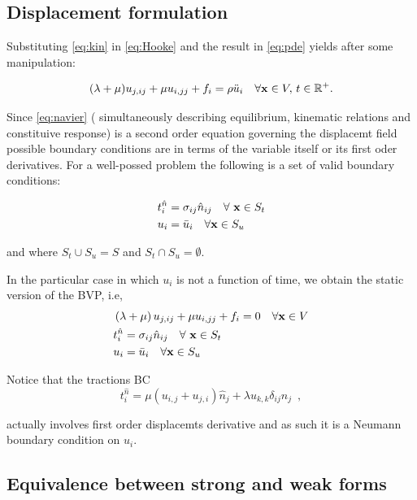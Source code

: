 \subsection*{Displacement formulation}
Substituting \cref{eq:kin} in \cref{eq:Hooke} and the result in \cref{eq:pde} yields after some manipulation:

\begin{equation} \label{eq:navier}
(\lambda  + \mu)u_{j,ij} + \mu u_{i,jj} + {f_i} = \rho \ddot{u}_i \quad \forall \vb{x} \in V,\, t \in \mathbb{R}^{+}.
\end{equation}

Since \cref{eq:navier} ( simultaneously describing equilibrium, kinematic relations and constituive response) is a second order equation governing the displacemt field possible boundary conditions are in terms of the variable itself or its first oder derivatives. For a well-possed problem the following is a set of valid boundary conditions: 

\begin{equation} \label{eq:Wellbcs}
\begin{split}
&t_i^{\hat n} = \sigma _{ij} \hat n_{ij} \quad \forall\ \vb{x} \in S_t\\
& {u_i} = \bar{u}_i \quad \forall \vb x \in S_u
\end{split}
\end{equation}

and where ${S_t} \cup {S_u} = S$ and ${S_t} \cap {S_u} = \emptyset $. 


In the particular case in which $u_i$ is not a function of time, we obtain the static version of the BVP, i.e,
\begin{equation}
\begin{split}
&\left(\lambda  + \mu \right)u_{j,ij} + \mu u_{i,jj} + {f_i} = 0 \quad \forall \vb{x} \in V \\
&t_i^{\hat n} = \sigma _{ij} \hat n_{ij} \quad \forall\ \vb{x} \in S_t\\
& {u_i} = \bar{u}_i \quad \forall \vb x \in S_u
\end{split}
\end{equation}

Notice that the tractions BC 
\[t_i^{\hat n} = \mu (u_{i,j} + u_{j,i}) \hat{n}_j + \lambda u_{k,k} \delta_{ij}\hat{n}_j \enspace ,\]

actually involves first order displacemts derivative and as such it is a Neumann boundary condition on $u_i$.
%

\subsection{Equivalence between strong and weak forms}
